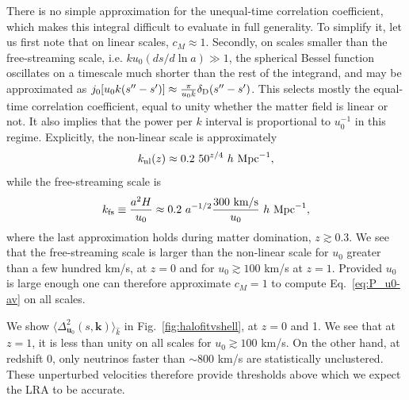 \documentclass[useAMS, usenatbib]{mnras}
\newcommand{\beq}{\begin{equation}}
\newcommand{\eeq}{\end{equation}}
\newcommand{\barr}{\begin{eqnarray}}
\newcommand{\earr}{\end{eqnarray}}
\newcommand{\bs}{\boldsymbol}
\begin{document}
There is no simple approximation for the unequal-time correlation coefficient, which makes this integral difficult to evaluate in full generality. To simplify it, let us first note that on linear scales, $c_M \approx 1$. Secondly, on scales smaller than the free-streaming scale, i.e. $k u_0 (ds/d\ln a) \gg 1$, the spherical Bessel function oscillates on a timescale much shorter than the rest of the integrand, and may be approximated as $j_0[u_0 k (s'' - s')] \approx \frac{\pi}{u_0 k} \delta_{\rm D}(s'' - s')$. This selects mostly the equal-time correlation coefficient, equal to unity whether the matter field is linear or not. It also implies that the power per $k$ interval is proportional to $u_0^{-1}$ in this regime.
Explicitly, the non-linear scale is approximately
 \beq
 k_{\rm nl}(z) \approx 0.2~50^{z/4}~ h ~ \textrm{Mpc}^{-1},
 \eeq
while the free-streaming scale is
\beq
k_{\rm fs} \equiv \frac{a^2 H}{u_0} \approx 0.2 ~a^ {-1/2}\frac{300~ \textrm{km/s}}{u_0} ~ h ~ \textrm{Mpc}^{-1},
\eeq
where the last approximation holds during matter domination, $z \gtrsim 0.3$. We see that the free-streaming scale is larger than the non-linear scale for $u_0$ greater than a few hundred km/s, at $z = 0$ and for $u_0 \gtrsim 100$ km/s at $z = 1$. Provided $u_0$ is large enough one can therefore approximate $c_M = 1$ to compute Eq.~\eqref{eq:P_u0-av} on all scales.

We show $\langle \Delta^2_{\bs{u}_0}(s, \bs{k})\rangle_{\hat{k}}$ in Fig.~\ref{fig:halofitvshell}, at $z = 0$ and 1. We see that at $z = 1$, it is less than unity on all scales for $u_0 \gtrsim 100$ km/s. On the other hand, at redshift 0, only neutrinos faster than $\sim 800$ km/s are statistically unclustered. These unperturbed velocities therefore provide thresholds above which we expect the LRA to be accurate.
\end{document}

